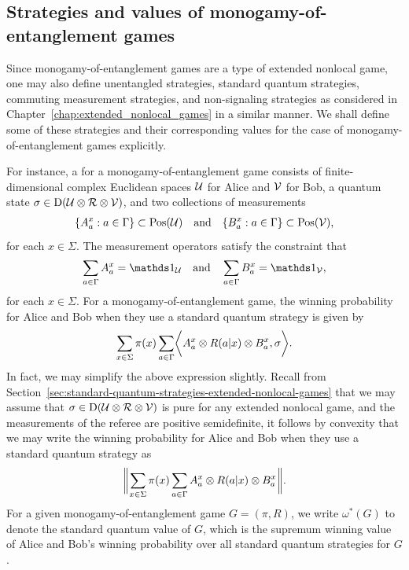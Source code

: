 \subsection{Strategies and values of monogamy-of-entanglement games}
Since monogamy-of-entanglement games are a type of extended nonlocal game, one may also define unentangled strategies, standard quantum strategies, commuting measurement strategies, and non-signaling strategies as considered in Chapter~\ref{chap:extended_nonlocal_games} in a similar manner. We shall define some of these strategies and their corresponding values for the case of monogamy-of-entanglement games explicitly. 

For instance, a  for a monogamy-of-entanglement game consists of finite-dimensional complex Euclidean spaces $\mathcal{U}$ for Alice and $\mathcal{V}$ for Bob, a quantum state $\sigma \in \mathrm{D}(\mathcal{U} \otimes \mathcal{R} \otimes \mathcal{V})$, and two collections of measurements 
\begin{align}
	\{ A_a^x : a \in \Gamma \} \subset \mathrm{Pos}(\mathcal{U}) \quad \textnormal{and} \quad \{ B_a^x : a \in \Gamma \} \subset \mathrm{Pos}(\mathcal{V}),
\end{align}
for each $x \in \Sigma$. The measurement operators satisfy the constraint that 
\begin{align}
	\sum_{a \in \Gamma} A_a^x = \I_{\U} \quad \textnormal{and} \quad \sum_{a \in \Gamma} B_a^x = \I_{\V},
\end{align}
for each $x \in \Sigma$. 
For a monogamy-of-entanglement game, the winning probability for Alice and Bob when they use a standard quantum strategy is given by 
\begin{align}
	\sum_{x \in \Sigma} \pi(x) \sum_{a \in \Gamma} \biggl\langle A_a^x \otimes R(a|x) \otimes B_a^x, \sigma \biggr\rangle.
\end{align}
In fact, we may simplify the above expression slightly. Recall from Section~\ref{sec:standard-quantum-strategies-extended-nonlocal-games} that we may assume that $\sigma \in \mathrm{D}(\mathcal{U} \otimes \mathcal{R} \otimes \mathcal{V})$ is pure for any extended nonlocal game, and the measurements of the referee are positive semidefinite, it follows by convexity that we may write the winning probability for Alice and Bob when they use a standard quantum strategy as 
\begin{align} \label{eq:monogamy-ent-val}
	\biggl\lVert\mspace{1mu} \sum_{x \in \Sigma} \pi(x) \sum_{a \in \Gamma} A_a^x \otimes R(a|x) \otimes B_a^x  \mspace{1mu}\biggr\rVert.
\end{align}
For a given monogamy-of-entanglement game $G = (\pi,R)$, we write $\omega^*(G)$ to denote the standard quantum value of $G$, which is the supremum winning value of Alice and Bob's winning probability over all standard quantum strategies for $G$. 

